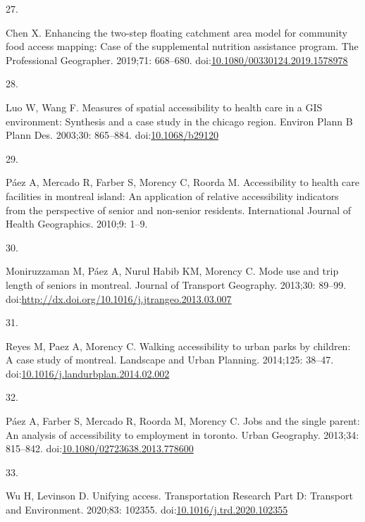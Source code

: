 \documentclass[10pt,letterpaper]{article}
\newlength{\cslhangindent}
\newlength{\csllabelwidth}
\newlength{\cslentryspacingunit} %
\newenvironment{CSLReferences}[2] %
 {%
  \setlength{\parindent}{0pt}
  \ifodd #1
  \let\oldpar\par
  \def\par{\hangindent=\cslhangindent\oldpar}
  \fi
  \setlength{\parskip}{#2\cslentryspacingunit}
 }%
 {}
\newcommand{\CSLLeftMargin}[1]{\parbox[t]{\csllabelwidth}{#1}}
\newcommand{\CSLRightInline}[1]{\parbox[t]{\linewidth - \csllabelwidth}{#1}\break}
\begin{document}
\begin{CSLReferences}{0}{0}
\leavevmode{}%
\CSLLeftMargin{27. }%
\CSLRightInline{Chen X. Enhancing the two-step floating catchment area
model for community food access mapping: Case of the supplemental
nutrition assistance program. The Professional Geographer. 2019;71:
668--680.
doi:\href{https://doi.org/10.1080/00330124.2019.1578978}{10.1080/00330124.2019.1578978}}

\leavevmode{}%
\CSLLeftMargin{28. }%
\CSLRightInline{Luo W, Wang F. Measures of spatial accessibility to
health care in a {GIS} environment: Synthesis and a case study in the
chicago region. Environ Plann B Plann Des. 2003;30: 865--884.
doi:\href{https://doi.org/10.1068/b29120}{10.1068/b29120}}

\leavevmode{}%
\CSLLeftMargin{29. }%
\CSLRightInline{Páez A, Mercado R, Farber S, Morency C, Roorda M.
Accessibility to health care facilities in montreal island: An
application of relative accessibility indicators from the perspective of
senior and non-senior residents. International Journal of Health
Geographics. 2010;9: 1--9. }

\leavevmode{}%
\CSLLeftMargin{30. }%
\CSLRightInline{Moniruzzaman M, Páez A, Nurul Habib KM, Morency C. Mode
use and trip length of seniors in montreal. Journal of Transport
Geography. 2013;30: 89--99.
doi:\url{http://dx.doi.org/10.1016/j.jtrangeo.2013.03.007}}

\leavevmode{}%
\CSLLeftMargin{31. }%
\CSLRightInline{Reyes M, Paez A, Morency C. Walking accessibility to
urban parks by children: A case study of montreal. Landscape and Urban
Planning. 2014;125: 38--47.
doi:\href{https://doi.org/10.1016/j.landurbplan.2014.02.002}{10.1016/j.landurbplan.2014.02.002}}

\leavevmode{}%
\CSLLeftMargin{32. }%
\CSLRightInline{Páez A, Farber S, Mercado R, Roorda M, Morency C. Jobs
and the single parent: An analysis of accessibility to employment in
toronto. Urban Geography. 2013;34: 815--842.
doi:\href{https://doi.org/10.1080/02723638.2013.778600}{10.1080/02723638.2013.778600}}

\leavevmode{}%
\CSLLeftMargin{33. }%
\CSLRightInline{Wu H, Levinson D. Unifying access. Transportation
Research Part D: Transport and Environment. 2020;83: 102355.
doi:\href{https://doi.org/10.1016/j.trd.2020.102355}{10.1016/j.trd.2020.102355}}


\end{CSLReferences}
\end{document}
